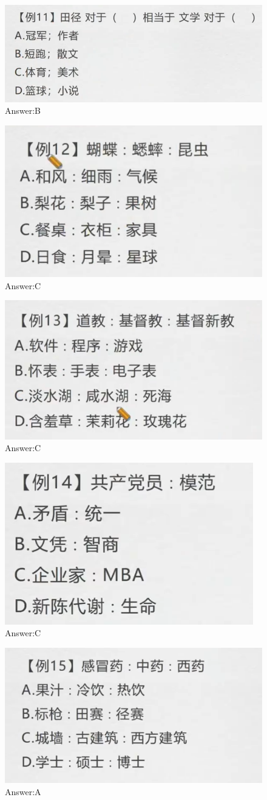 \documentclass{article}
\numberwithin{equation}{section}						%
\numberwithin{figure}{section}							%
\begin{document}
\begin{sloppypar}
\begin{figure}[H]
     \centering
     \includegraphics[width=0.4\linewidth]{111.png}
		\caption{Answer:B}
\end{figure}


\begin{figure}[H]
     \centering
     \includegraphics[width=0.4\linewidth]{112.png}
		\caption{Answer:C}
\end{figure}


\begin{figure}[H]
     \centering
     \includegraphics[width=0.4\linewidth]{113.png}
		\caption{Answer:C}
\end{figure}


\begin{figure}[H]
     \centering
     \includegraphics[width=0.4\linewidth]{114.png}
		\caption{Answer:C}
\end{figure}


\begin{figure}[H]
     \centering
     \includegraphics[width=0.4\linewidth]{115.png}
		\caption{Answer:A}
\end{figure}



\end{sloppypar}
\end{document}

